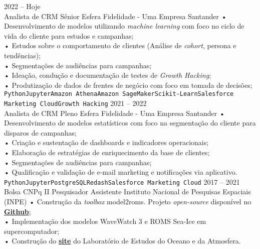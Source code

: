 \documentclass[9pt]{developercv} %
\begin{document}
\begin{entrylist}
	\entry
		{2022 --  Hoje\\}
		{Analista de CRM Sênior}
		{Esfera Fidelidade - Uma Empresa Santander}
		{• Desenvolvimento de modelos utilizando \textit{machine learning} com foco no ciclo de vida do cliente para estudos e campanhas;\\
		• Estudos sobre o comportamento de clientes (Análise de \textit{cohort}, persona e tendências);\\ 
		• Segmentações de audiências para campanhas;\\
		• Ideação, condução e documentação de testes de \textit{Growth Hacking};\\
		• Produtização de dados de frentes de negócio com foco em tomada de decisões;\\
		\texttt{Python}\slashsep\texttt{Jupyter}\slashsep\texttt{Amazon Athena}\slashsep\texttt{Amazon SageMaker}\slashsep\texttt{Scikit-Learn}\slashsep\texttt{Salesforce Marketing Cloud}\slashsep\texttt{Growth Hacking}}
		\entry
		{2021 --  2022\\}
		{Analista de CRM Pleno}
		{Esfera Fidelidade - Uma Empresa Santander}
		{• Desenvolvimento de modelos estatísticos com foco na segmentação do cliente para disparos de campanhas;\\
		• Criação e sustentação de dashboards e indicadores operacionais;\\
		• Elaboração de estratégias de enriquecimento da base de clientes;\\
		• Segmentações de audiências para campanhas;\\
		• Qualificação e validação de e-mail marketing e notificações via aplicativo.\\
		\texttt{Python}\slashsep\texttt{Jupyter}\slashsep\texttt{PostgreSQL}\slashsep\texttt{Redash}\slashsep\texttt{Salesforce Marketing Cloud}}
		\entry
		{2017 -- 2021\\\footnotesize{Bolsa CNPq II}}
		{Pesquisador Assistente}
		{Instituto Nacional de Pesquisas Espaciais (INPE)}
		{• Construção da \textit{toolbox} model2roms. Projeto \textit{open-source} disponível no \href{https://github.com/uesleisutil/model2roms}{\textcolor{bleu_cite}{\textbf{Github}}}; \\	
		• Implementação dos modelos WaveWatch 3 e ROMS Sea-Ice em supercomputador;\\
		• Construção do \href{https://loa-inpe.github.io/}{\textcolor{bleu_cite}{\textbf{site}}} do Laboratório de Estudos do Oceano e da Atmosfera. \\
}
\end{entrylist}
\end{document}
